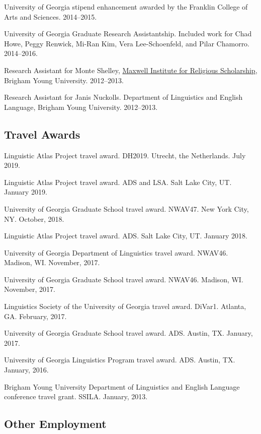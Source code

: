 \documentclass[
]{article}
\begin{document}
University of Georgia stipend enhancement awarded by the Franklin
College of Arts and Sciences. 2014--2015.

University of Georgia Graduate Research Assistantship. Included work for
Chad Howe, Peggy Renwick, Mi-Ran Kim, Vera Lee-Schoenfeld, and Pilar
Chamorro. 2014--2016.

Research Assistant for Monte Shelley, \href{https://mi.byu.edu}{Maxwell
Institute for Religious Scholarship}, Brigham Young University.
2012--2013.

Research Assistant for Janis Nuckolls. Department of Linguistics and
English Language, Brigham Young University. 2012--2013.

\hypertarget{travel-awards}{%
\subsection{Travel Awards}\label{travel-awards}}

Linguistic Atlas Project travel award. DH2019. Utrecht, the Netherlands.
July 2019.

Linguistic Atlas Project travel award. ADS and LSA. Salt Lake City, UT.
January 2019.

University of Georgia Graduate School travel award. NWAV47. New York
City, NY. October, 2018.

Linguistic Atlas Project travel award. ADS. Salt Lake City, UT. January
2018.

University of Georgia Department of Linguistics travel award. NWAV46.
Madison, WI. November, 2017.

University of Georgia Graduate School travel award. NWAV46. Madison, WI.
November, 2017.

Linguistics Society of the University of Georgia travel award. DiVar1.
Atlanta, GA. February, 2017.

University of Georgia Graduate School travel award. ADS. Austin, TX.
January, 2017.

University of Georgia Linguistics Program travel award. ADS. Austin, TX.
January, 2016.

Brigham Young University Department of Linguistics and English Language
conference travel grant. SSILA. January, 2013.

\hypertarget{other-employment}{%
\subsection{Other Employment}\label{other-employment}}
\end{document}
